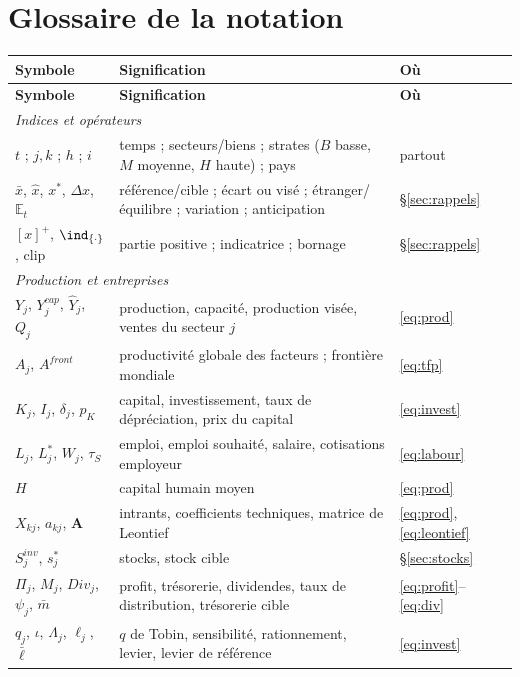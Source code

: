 \documentclass[11pt,a4paper]{article}
\newcommand{\E}{\mathbb{E}}
\newcommand{\pos}[1]{{\left[#1\right]^{+}}}
\begin{document}
\newpage
\appendix
\section{Glossaire de la notation}
\label{sec:glossaire}
\small
\begin{longtable}{p{4.3cm}p{7.8cm}p{3.3cm}}
\toprule
\textbf{Symbole} & \textbf{Signification} & \textbf{Où}\\
\midrule
\endfirsthead
\toprule
\textbf{Symbole} & \textbf{Signification} & \textbf{Où}\\
\midrule
\endhead
\multicolumn{3}{l}{\emph{Indices et opérateurs}}\\
$t$ ; $j,k$ ; $h$ ; $i$ & temps ; secteurs/biens ; strates ($B$ basse, $M$ moyenne, $H$ haute) ; pays & partout\\
$\bar x$, $\hat x$, $x^\ast$, $\Delta x$, $\E_t$ & référence/cible ; écart ou visé ; étranger/équilibre ; variation ; anticipation & \S\ref{sec:rappels}\\
$\pos{x}$, $\ind_{\{\cdot\}}$, clip & partie positive ; indicatrice ; bornage & \S\ref{sec:rappels}\\
\midrule
\multicolumn{3}{l}{\emph{Production et entreprises}}\\
$Y_j$, $Y^{cap}_j$, $\hat Y_j$, $Q_j$ & production, capacité, production visée, ventes du secteur $j$ & \eqref{eq:prod}\\
$A_j$, $A^{front}$ & productivité globale des facteurs ; frontière mondiale & \eqref{eq:tfp}\\
$K_j$, $I_j$, $\delta_j$, $p_K$ & capital, investissement, taux de dépréciation, prix du capital & \eqref{eq:invest}\\
$L_j$, $L^\ast_j$, $W_j$, $\tau_S$ & emploi, emploi souhaité, salaire, cotisations employeur & \eqref{eq:labour}\\
$H$ & capital humain moyen & \eqref{eq:prod}\\
$X_{kj}$, $a_{kj}$, $\mathbf{A}$ & intrants, coefficients techniques, matrice de Leontief & \eqref{eq:prod}, \eqref{eq:leontief}\\
$S^{inv}_j$, $s^\ast_j$ & stocks, stock cible & \S\ref{sec:stocks}\\
$\Pi_j$, $M_j$, $Div_j$, $\psi_j$, $\bar m$ & profit, trésorerie, dividendes, taux de distribution, trésorerie cible & \eqref{eq:profit}--\eqref{eq:div}\\
$q_j$, $\iota$, $\Lambda_j$, $\ell_j$, $\bar\ell$ & $q$ de Tobin, sensibilité, rationnement, levier, levier de référence & \eqref{eq:invest}\\

\end{longtable}
\end{document}
